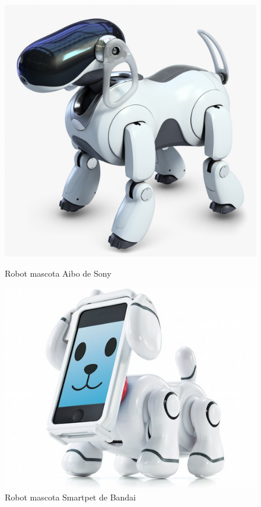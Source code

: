  
 \begin{figure}
\centering
\begin{minipage}{0.45\textwidth}
\centering
\includegraphics[width=1\linewidth]{imagenes/aiborobot.jpg}
	\caption{Robot mascota Aibo de Sony}
	\label{fig:aiborobot}

\end{minipage}\hfill
\begin{minipage}{0.45\textwidth}
\centering
\includegraphics[width=1\linewidth]{imagenes/bandaismartpet.jpg}
	\caption{Robot mascota Smartpet de Bandai}
	\label{fig:bandaismartpet}

\end{minipage}
\end{figure}


